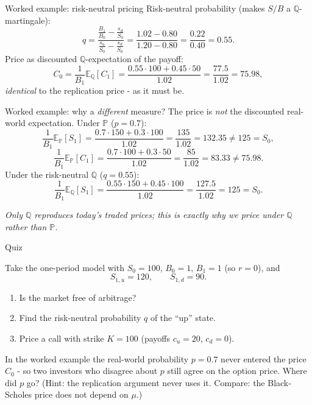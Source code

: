 \documentclass[pdf, handout]{beamer}
\begin{document}
\begin{frame}{Worked example: risk-neutral pricing}
Risk-neutral probability (makes $S/B$ a $\mathbb{Q}$-martingale):
\[
q=\frac{\frac{B_1}{B_0}-\frac{s_d}{S_0}}{\frac{s_u}{S_0}-\frac{s_d}{S_0}}
=\frac{1.02-0.80}{1.20-0.80}=\frac{0.22}{0.40}=0.55 .
\]
Price as discounted $\mathbb{Q}$-expectation of the payoff:
\[
C_0=\frac{1}{B_1}\mathbb{E}_{\mathbb{Q}}[C_1]=\frac{0.55\cdot100+0.45\cdot50}{1.02}=\frac{77.5}{1.02}=75.98 ,
\]
\emph{identical} to the replication price - as it must be.
\end{frame}

\begin{frame}{Worked example: why a \emph{different} measure?}
The price is \emph{not} the discounted real-world expectation. Under $\mathbb{P}$ ($p=0.7$):
\[
\frac{1}{B_1}\mathbb{E}_{\mathbb{P}}[S_1]=\frac{0.7\cdot150+0.3\cdot100}{1.02}=\frac{135}{1.02}=132.35\neq 125=S_0,
\]
\[
\frac{1}{B_1}\mathbb{E}_{\mathbb{P}}[C_1]=\frac{0.7\cdot100+0.3\cdot50}{1.02}=\frac{85}{1.02}=83.33\neq 75.98 .
\]
Under the risk-neutral $\mathbb{Q}$ ($q=0.55$):
\[
\frac{1}{B_1}\mathbb{E}_{\mathbb{Q}}[S_1]=\frac{0.55\cdot150+0.45\cdot100}{1.02}=\frac{127.5}{1.02}=125=S_0 .
\]
\begin{center}
\emph{Only $\mathbb{Q}$ reproduces today's traded prices; this is exactly why we price under $\mathbb{Q}$ rather than $\mathbb{P}$.}
\end{center}
\end{frame}

\begin{frame}{Quiz}
\begin{quizbox}
Take the one-period model with $S_0=100$, $B_0=1$, $B_1=1$ (so $r=0$), and
\[ S_{1,u}=120,\qquad S_{1,d}=90 .\]
\begin{enumerate}
\item Is the market free of arbitrage?
\item Find the risk-neutral probability $q$ of the ``up'' state.
\item Price a call with strike $K=100$ (payoffs $c_u=20$, $c_d=0$).
\end{enumerate}
\end{quizbox}
\medskip
\begin{fftbox}
In the worked example the real-world probability $p=0.7$ never entered the price $C_0$ - so two investors who disagree about $p$ still agree on the option price. Where did $p$ go? (Hint: the replication argument never uses it. Compare: the Black-Scholes price does not depend on $\mu$.)
\end{fftbox}
\end{frame}
\end{document}
